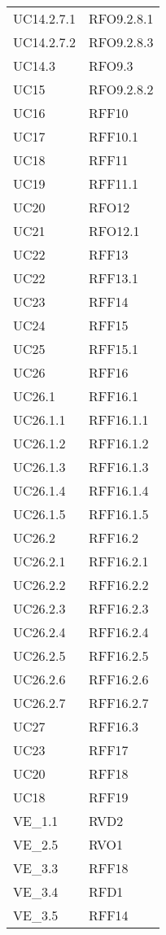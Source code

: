 \begin{longtable}{ >{\centering}p{}
			>{\centering}p{}}
UC14.2.7.1 & RFO9.2.8.1 \tabularnewline
UC14.2.7.2 & RFO9.2.8.3 \tabularnewline
UC14.3 & RFO9.3 \tabularnewline
UC15 & RFO9.2.8.2 \tabularnewline
UC16 & RFF10 \tabularnewline
UC17 & RFF10.1 \tabularnewline
UC18 & RFF11 \tabularnewline
UC19 & RFF11.1 \tabularnewline
UC20 & RFO12 \tabularnewline
UC21 & RFO12.1 \tabularnewline
UC22 & RFF13 \tabularnewline
UC22 & RFF13.1 \tabularnewline
UC23 & RFF14 \tabularnewline
UC24 & RFF15 \tabularnewline
UC25 & RFF15.1 \tabularnewline
UC26 & RFF16 \tabularnewline
UC26.1 & RFF16.1 \tabularnewline
UC26.1.1 & RFF16.1.1 \tabularnewline
UC26.1.2 & RFF16.1.2 \tabularnewline
UC26.1.3 & RFF16.1.3 \tabularnewline
UC26.1.4 & RFF16.1.4 \tabularnewline
UC26.1.5 & RFF16.1.5 \tabularnewline
UC26.2 & RFF16.2 \tabularnewline
UC26.2.1 & RFF16.2.1 \tabularnewline
UC26.2.2 & RFF16.2.2 \tabularnewline
UC26.2.3 & RFF16.2.3 \tabularnewline
UC26.2.4 & RFF16.2.4 \tabularnewline
UC26.2.5 & RFF16.2.5 \tabularnewline
UC26.2.6 & RFF16.2.6 \tabularnewline
UC26.2.7 & RFF16.2.7 \tabularnewline
UC27 & RFF16.3 \tabularnewline
UC23 & RFF17 \tabularnewline
UC20 & RFF18 \tabularnewline
UC18 & RFF19 \tabularnewline
VE\_1.1 & RVD2 \tabularnewline
VE\_2.5 & RVO1 \tabularnewline
VE\_3.3 & RFF18 \tabularnewline
VE\_3.4 & RFD1 \tabularnewline
VE\_3.5 & RFF14 \tabularnewline
	\end{longtable}
